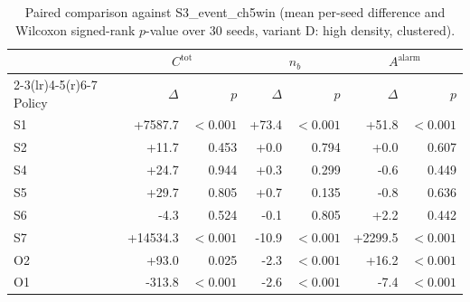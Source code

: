 \begin{table}[htbp]
\centering
\caption{Paired comparison against S3_event_ch5win (mean per-seed difference and
Wilcoxon signed-rank $p$-value over 30 seeds, variant D: high density, clustered).}
\label{tab:ch6-paired-D}
\begin{tabular}{@{}lrrrrrr@{}}
\toprule
& \multicolumn{2}{c}{$C^{\mathrm{tot}}$} & \multicolumn{2}{c}{$n_b$}
& \multicolumn{2}{c}{$A^{\mathrm{alarm}}$} \\
\cmidrule(r){2-3}\cmidrule(lr){4-5}\cmidrule(r){6-7}
Policy & $\Delta$ & $p$ & $\Delta$ & $p$ & $\Delta$ & $p$ \\
\midrule

S1 & +7587.7 & $<0.001$ & +73.4 & $<0.001$ & +51.8 & $<0.001$ \\
S2 & +11.7 & 0.453 & +0.0 & 0.794 & +0.0 & 0.607 \\
S4 & +24.7 & 0.944 & +0.3 & 0.299 & -0.6 & 0.449 \\
S5 & +29.7 & 0.805 & +0.7 & 0.135 & -0.8 & 0.636 \\
S6 & -4.3 & 0.524 & -0.1 & 0.805 & +2.2 & 0.442 \\
S7 & +14534.3 & $<0.001$ & -10.9 & $<0.001$ & +2299.5 & $<0.001$ \\
O2 & +93.0 & 0.025 & -2.3 & $<0.001$ & +16.2 & $<0.001$ \\
O1 & -313.8 & $<0.001$ & -2.6 & $<0.001$ & -7.4 & $<0.001$ \\
\bottomrule
\end{tabular}
\end{table}
